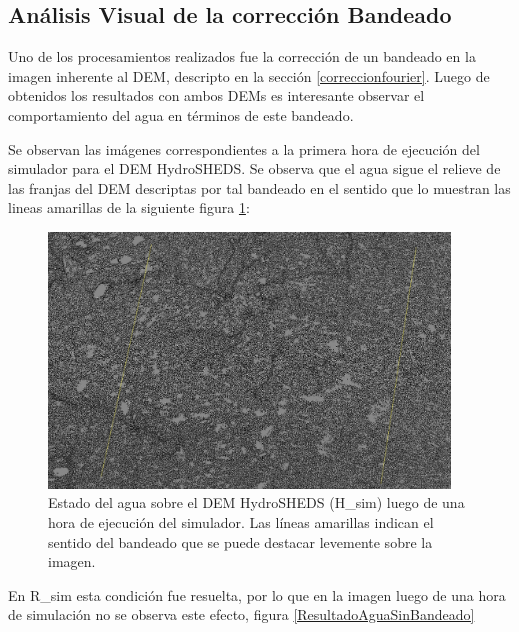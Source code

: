 \documentclass[10pt,a4paper, twoside]{report}
\begin{document}
\subsection{Análisis Visual de la corrección Bandeado}

Uno de los procesamientos realizados fue la corrección de un bandeado en la imagen inherente al DEM, descripto en la sección \ref{correccionfourier}. Luego de obtenidos los resultados con ambos DEMs es interesante observar el comportamiento del agua en términos de este bandeado.

Se observan las imágenes correspondientes a la primera hora de ejecución del simulador para el DEM HydroSHEDS. Se observa que el agua sigue el relieve de las franjas del DEM descriptas por tal bandeado en el sentido que lo muestran las lineas amarillas de la siguiente figura \ref{ResultadoAguaBandeado}: 

\begin{figure}[H]
   \centering      
   \includegraphics[width=0.95\textwidth]{imagenes/ResultadoAguaBandeado.jpg}
 \caption{Estado del agua sobre el DEM HydroSHEDS (H\_sim) luego de una hora de ejecución del simulador. Las líneas amarillas indican el sentido del bandeado que se puede destacar levemente sobre la imagen.}
 \label{ResultadoAguaBandeado}
\end{figure}

En R\_sim esta condición fue resuelta, por lo que en la imagen luego de una hora de simulación no se observa este efecto, figura \ref{ResultadoAguaSinBandeado}
\end{document}
